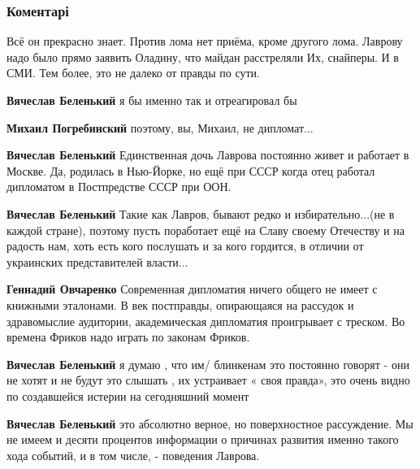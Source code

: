  
 
 
 
 
\subsubsection{Коментарі}

\begin{itemize} %
Всё он прекрасно знает.
Против лома нет приёма, кроме другого лома.
Лаврову надо было прямо заявить Оладину, что майдан расстреляли Их, снайперы.
И в СМИ.
Тем более, это не далеко от правды по сути.

\begin{itemize} %
\textbf{Вячеслав Беленький} я бы именно так и отреагировал бы

\textbf{Михаил Погребинский} поэтому, вы, Михаил, не дипломат...

\textbf{Вячеслав Беленький} Единственная дочь Лаврова постоянно живет и работает в Москве. Да, родилась в Нью-Йорке, но ещё при СССР когда отец работал дипломатом в Постпредстве СССР при ООН.

\textbf{Вячеслав Беленький} Такие как Лавров, бывают редко и избирательно...(не в каждой стране), поэтому пусть поработает ещё на Славу своему Отечеству и на радость нам, хоть есть кого послушать и за кого гордится, в отличии от украинских представителей власти...

\textbf{Геннадий Овчаренко} Современная дипломатия ничего общего не имеет с книжными эталонами.
В век постправды, опирающаяся на рассудок и здравомыслие аудитории, академическая дипломатия проигрывает с треском.
Во времена Фриков надо играть по законам Фриков.

\textbf{Вячеслав Беленький} я думаю , что им/ блинкенам это постоянно говорят - они не хотят и не будут это слышать , их устраивает « своя правда», это очень видно по создавшейся истерии на сегодняшний момент

\textbf{Вячеслав Беленький} это абсолютно верное, но поверхностное рассуждение.
Мы не имеем и десяти процентов информации о причинах развития именно такого хода событий, и в том числе, - поведения Лаврова.


\end{itemize}
\end{itemize}

